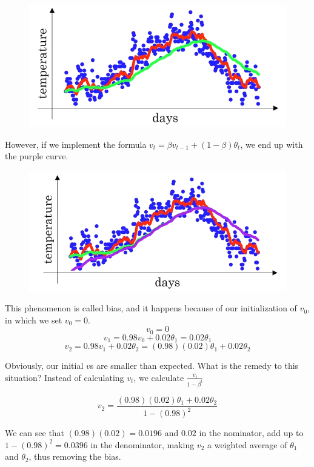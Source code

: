 \begin{figure}[H]
    \includegraphics[scale=0.35]{images/green.png}
    \centering
\end{figure}

However, if we implement the formula $v_t = \beta v_{t-1} + (1-\beta)\theta_{t}$, we end up with the purple curve.

\begin{figure}[H]
    \includegraphics[scale=0.35]{images/purple.png}
    \centering
\end{figure}

This phenomenon is called bias, and it happens because of our initialization of $v_0$, in which we set $v_0=0$. 
 $$
 v_0=0
 $$
 $$
 v_1 = 0.98v_0+0.02\theta_1=0.02\theta_1
 $$
 $$
 v_2 = 0.98v_1+0.02\theta_2 = (0.98)(0.02)\theta_1 + 0.02\theta_2
 $$

 Obviously, our initial $v$s are smaller than expected. What is the remedy to this situation? Instead of calculating $v_t$, we calculate $\frac{v_t}{1-\beta^{t}}$

 $$
 v_2 = \frac{(0.98)(0.02)\theta_1 + 0.02\theta_2}{1-(0.98)^2}
 $$

 We can see that $(0.98)(0.02)=0.0196$ and $0.02$ in the nominator, add up to $1-(0.98)^2 = 0.0396$ in the denominator, making $v_2$ a weighted average of $\theta_1$ and $\theta_2$, thus removing the bias.

